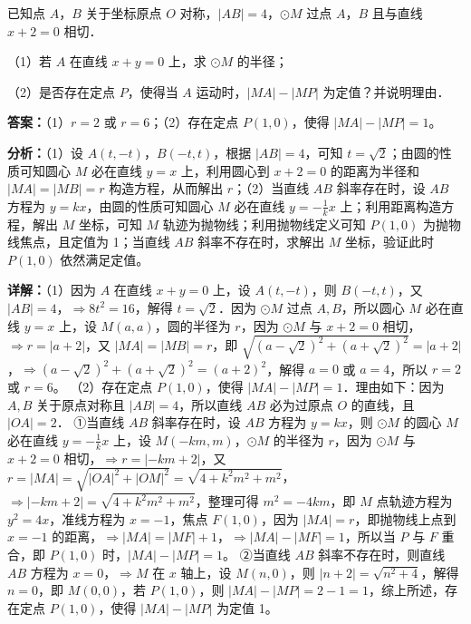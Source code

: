 \begin{question}[points=12]
已知点 $A$，$B$ 关于坐标原点 $O$ 对称，$|AB| = 4$，$\odot M$ 过点 $A$，$B$ 且与直线 $x+2=0$ 相切．

（1）若 $A$ 在直线 $x+y=0$ 上，求 $\odot M$ 的半径；

（2）是否存在定点 $P$，使得当 $A$ 运动时，$|MA| - |MP|$ 为定值？并说明理由．
\begin{solution}
\textbf{答案：}（1）$r=2$ 或 $r=6$；（2）存在定点 $P(1,0)$，使得 $|MA|-|MP|=1$。

\textbf{分析：}（1）设 $A(t,-t)$，$B(-t,t)$，根据 $|AB|=4$，可知 $t=\sqrt{2}$；由圆的性质可知圆心 $M$ 必在直线 $y=x$ 上，利用圆心到 $x+2=0$ 的距离为半径和 $|MA|=|MB|=r$ 构造方程，从而解出 $r$；（2）当直线 $AB$ 斜率存在时，设 $AB$ 方程为 $y=kx$，由圆的性质可知圆心 $M$ 必在直线 $y=-\frac{1}{k}x$ 上；利用距离构造方程，解出 $M$ 坐标，可知 $M$ 轨迹为抛物线；利用抛物线定义可知 $P(1,0)$ 为抛物线焦点，且定值为 1；当直线 $AB$ 斜率不存在时，求解出 $M$ 坐标，验证此时 $P(1,0)$ 依然满足定值。

\textbf{详解：}（1）因为 $A$ 在直线 $x+y=0$ 上，设 $A(t,-t)$，则 $B(-t,t)$，又 $|AB|=4$，$\Rightarrow 8t^2=16$，解得 $t=\sqrt{2}$．因为 $\odot M$ 过点 $A,B$，所以圆心 $M$ 必在直线 $y=x$ 上，设 $M(a,a)$，圆的半径为 $r$，因为 $\odot M$ 与 $x+2=0$ 相切，$\Rightarrow r=|a+2|$，又 $|MA|=|MB|=r$，即 $\sqrt{(a-\sqrt{2})^2+(a+\sqrt{2})^2}=|a+2|$，$\Rightarrow (a-\sqrt{2})^2+(a+\sqrt{2})^2 = (a+2)^2$，解得 $a=0$ 或 $a=4$，所以 $r=2$ 或 $r=6$。
（2）存在定点 $P(1,0)$，使得 $|MA|-|MP|=1$．理由如下：因为 $A,B$ 关于原点对称且 $|AB|=4$，所以直线 $AB$ 必为过原点 $O$ 的直线，且 $|OA|=2$．
①当直线 $AB$ 斜率存在时，设 $AB$ 方程为 $y=kx$，则 $\odot M$ 的圆心 $M$ 必在直线 $y=-\frac{1}{k}x$ 上，设 $M(-km,m)$，$\odot M$ 的半径为 $r$，因为 $\odot M$ 与 $x+2=0$ 相切，$\Rightarrow r=|-km+2|$，又 $r=|MA|=\sqrt{|OA|^2+|OM|^2}=\sqrt{4+k^2m^2+m^2}$，$\Rightarrow |-km+2|=\sqrt{4+k^2m^2+m^2}$，整理可得 $m^2=-4km$，即 $M$ 点轨迹方程为 $y^2=4x$，准线方程为 $x=-1$，焦点 $F(1,0)$，因为 $|MA|=r$，即抛物线上点到 $x=-1$ 的距离，$\Rightarrow |MA|=|MF|+1$，$\Rightarrow |MA|-|MF|=1$，所以当 $P$ 与 $F$ 重合，即 $P(1,0)$ 时，$|MA|-|MP|=1$。
②当直线 $AB$ 斜率不存在时，则直线 $AB$ 方程为 $x=0$，$\Rightarrow M$ 在 $x$ 轴上，设 $M(n,0)$，则 $|n+2|=\sqrt{n^2+4}$，解得 $n=0$，即 $M(0,0)$，若 $P(1,0)$，则 $|MA|-|MP|=2-1=1$，综上所述，存在定点 $P(1,0)$，使得 $|MA|-|MP|$ 为定值 1。
\end{solution}
\end{question}


